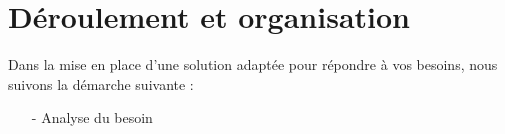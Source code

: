\section{Déroulement et organisation}

Dans la mise en place d'une solution adaptée pour répondre à vos besoins, nous suivons la démarche suivante :

\begin{itemize}
\item[-] Analyse du besoin
\end{itemize}
